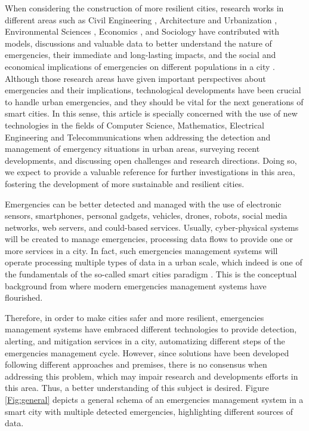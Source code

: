 \begin{refsection}
When considering the construction of more resilient cities, research works in different areas such as Civil Engineering \cite{civilengineering1,civilengineering2}, Architecture and Urbanization \cite{architecture1,architecture2}, Environmental Sciences \cite{enviroment1,enviroment2}, Economics \cite{economics1,economics2}, and Sociology \cite{sociology1,sociology2} have contributed with models, discussions and valuable data to better understand the nature of emergencies, their immediate and long-lasting impacts, and the social and economical implications of emergencies on different populations in a city \cite{emergenciesmetric1,citiesemergencies1}. Although those research areas have given important perspectives about emergencies and their implications, technological developments have been crucial to handle urban emergencies, and they should be vital for the next generations of smart cities. In this sense, this article is specially concerned with the use of new technologies in the fields of Computer Science, Mathematics, Electrical Engineering and Telecommunications when addressing the detection and management of emergency situations in urban areas, surveying recent developments, and discussing open challenges and research directions. Doing so, we expect to provide a valuable reference for further investigations in this area, fostering the development of more sustainable and resilient cities. 

Emergencies can be better detected and managed with the use of electronic sensors, smartphones, personal gadgets, vehicles, drones, robots, social media networks, web servers, and could-based services. Usually, cyber-physical systems will be created to manage emergencies, processing data flows to provide one or more services in a city. In fact, such emergencies management systems will operate processing multiple types of data in a urban scale, which indeed is one of the fundamentals of the so-called smart cities paradigm \cite{smartcities4}. This is the conceptual background from where modern emergencies management systems have flourished.

Therefore, in order to make cities safer and more resilient, emergencies management systems have embraced different technologies to provide detection, alerting, and mitigation services in a city, automatizing different steps of the emergencies management cycle. However, since solutions have been developed following different approaches and premises, there is no consensus when addressing this problem, which may impair research and developments efforts in this area. Thus, a better understanding of this subject is desired. Figure \ref{Fig:general} depicts a general schema of an emergencies management system in a smart city with multiple detected emergencies, highlighting different sources of data.


\end{refsection}
